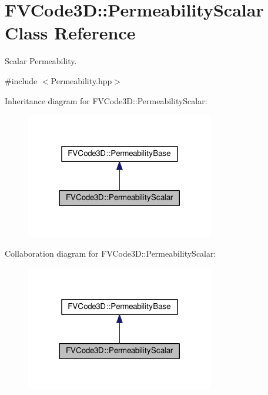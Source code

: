 \hypertarget{classFVCode3D_1_1PermeabilityScalar}{}\section{F\+V\+Code3D\+:\+:Permeability\+Scalar Class Reference}
\label{classFVCode3D_1_1PermeabilityScalar}


Scalar Permeability.  




{\ttfamily \#include $<$Permeability.\+hpp$>$}



Inheritance diagram for F\+V\+Code3D\+:\+:Permeability\+Scalar\+:
\nopagebreak
\begin{figure}[H]
\begin{center}
\leavevmode
\includegraphics[width=233pt]{classFVCode3D_1_1PermeabilityScalar__inherit__graph}
\end{center}
\end{figure}


Collaboration diagram for F\+V\+Code3D\+:\+:Permeability\+Scalar\+:
\nopagebreak
\begin{figure}[H]
\begin{center}
\leavevmode
\includegraphics[width=233pt]{classFVCode3D_1_1PermeabilityScalar__coll__graph}
\end{center}
\end{figure}
